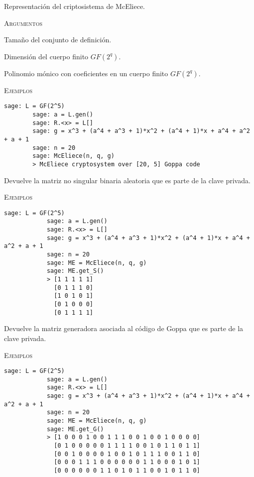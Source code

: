 \begin{description}[leftmargin=1em, font=\normalfont\ttfamily, style=nextline]
    \item[class McEliece(self, n, q, g)]
  
    Representación del criptosistema de McEliece.
  
    \textsc{Argumentos}
    \begin{description}[font=\normalfont\ttfamily]
        \item[n] Tamaño del conjunto de definición.
        \item[q] Dimensión del cuerpo finito $GF(2^q)$.
        \item[g] Polinomio mónico con coeficientes en un cuerpo finito $GF(2^q)$.
    \end{description}

    \textsc{Ejemplos}
    \begin{lstlisting}[gobble=4]
        sage: L = GF(2^5)
        sage: a = L.gen()
        sage: R.<x> = L[]
        sage: g = x^3 + (a^4 + a^3 + 1)*x^2 + (a^4 + 1)*x + a^4 + a^2 + a + 1
        sage: n = 20
        sage: McEliece(n, q, g)
        > McEliece cryptosystem over [20, 5] Goppa code
    \end{lstlisting}

    \begin{description}[font=\ttfamily, style=nextline]
        \item[get\_S(self)] Devuelve la matriz no singular binaria aleatoria que es parte de la clave privada.

        \textsc{Ejemplos}
        \begin{lstlisting}[gobble=4]
            sage: L = GF(2^5)
            sage: a = L.gen()
            sage: R.<x> = L[]
            sage: g = x^3 + (a^4 + a^3 + 1)*x^2 + (a^4 + 1)*x + a^4 + a^2 + a + 1
            sage: n = 20
            sage: ME = McEliece(n, q, g)
            sage: ME.get_S()
            > [1 1 1 1 1]
              [0 1 1 1 0]
              [1 0 1 0 1]
              [0 1 0 0 0]
              [0 1 1 1 1]
        \end{lstlisting}

        \item[get\_G(self)] Devuelve la matriz generadora asociada al código de Goppa que es parte de la clave privada.

        \textsc{Ejemplos}
        \begin{lstlisting}[gobble=4]
            sage: L = GF(2^5)
            sage: a = L.gen()
            sage: R.<x> = L[]
            sage: g = x^3 + (a^4 + a^3 + 1)*x^2 + (a^4 + 1)*x + a^4 + a^2 + a + 1
            sage: n = 20
            sage: ME = McEliece(n, q, g)
            sage: ME.get_G()
            > [1 0 0 0 1 0 0 1 1 1 0 0 1 0 0 1 0 0 0 0]
              [0 1 0 0 0 0 0 1 1 1 1 0 0 1 0 1 1 0 1 1]
              [0 0 1 0 0 0 0 1 0 0 1 0 1 1 1 0 0 1 1 0]
              [0 0 0 1 1 1 0 0 0 0 0 0 1 1 0 0 0 1 0 1]
              [0 0 0 0 0 0 1 1 0 1 0 1 1 0 0 1 0 1 1 0]
        \end{lstlisting}


\end{description}
\end{description}
